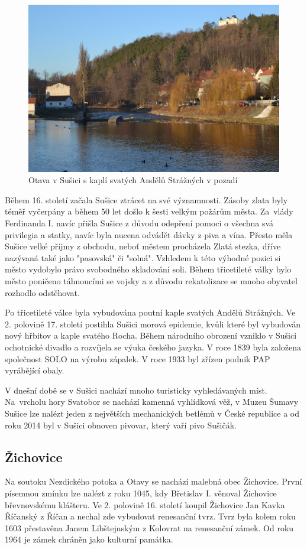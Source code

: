 \documentclass[thesis=M,czech]{FITthesis}[2012/06/26]
\begin{document}
\begin{figure}[h!]
	\centering
	\includegraphics[width=12cm]{pics/susice.jpg}
	\caption{Otava v Sušici s kaplí svatých Andělů Strážných v pozadí}
	\label{obrazek:susice}
\end{figure}

Během 16. století začala Sušice ztrácet na své významnosti. Zásoby zlata byly téměř vyčerpány a během 50 let došlo k šesti velkým požárům města. Za~vlády Ferdinanda I. navíc přišla Sušice z důvodu odepření pomoci o všechna svá privilegia a statky, navíc byla nucena odvádět dávky z piva a vína. Přesto měla Sušice velké příjmy z obchodu, neboť městem procházela Zlatá stezka, dříve nazývaná také jako "pasovská" či "solná". Vzhledem k této výhodné pozici si město vydobylo právo svobodného skladování soli. Během třicetileté války bylo město poničeno táhnoucími se vojsky a z důvodu rekatolizace se mnoho obyvatel rozhodlo odstěhovat. 

Po třicetileté válce byla vybudována poutní kaple svatých Andělů Strážných. Ve 2. polovině 17. století postihla Sušici morová epidemie, kvůli které byl vybudován nový hřbitov a kaple svatého Rocha. Během národního obrození vzniklo v Sušici ochotnické divadlo a rozvíjela se výuka českého jazyka. V roce 1839 byla založena společnost SOLO na výrobu zápalek. V roce 1933 byl zřízen podnik PAP vyrábějící obaly. 

V dnešní době se v Sušici nachází mnoho turisticky vyhledávaných míst. Na~vrcholu hory Svatobor se nachází kamenná vyhlídková věž,  v Muzeu Šumavy Sušice lze nalézt jeden z největších mechanických betlémů v České republice a od roku 2014 byl v Sušici obnoven pivovar, který vaří pivo Sušičák. \cite{SMOOS} \cite{susice}


\subsection{Žichovice}
Na soutoku Nezdického potoka a Otavy se nachází malebná obec Žichovice. První písemnou zmínku lze nalézt z roku 1045, kdy Břetislav I. věnoval Žichovice břevnovskému klášteru. Ve 2. polovině 16. století koupil Žichovice Jan Kavka Říčanský z Říčan a nechal zde vybudovat renesanční tvrz. Tvrz byla kolem roku 1603 přestavěna Janem Libštejnským z Kolovrat na renesanční zámek. Od roku 1964 je zámek chráněn jako kulturní památka. \cite{zichovice}
\end{document}
